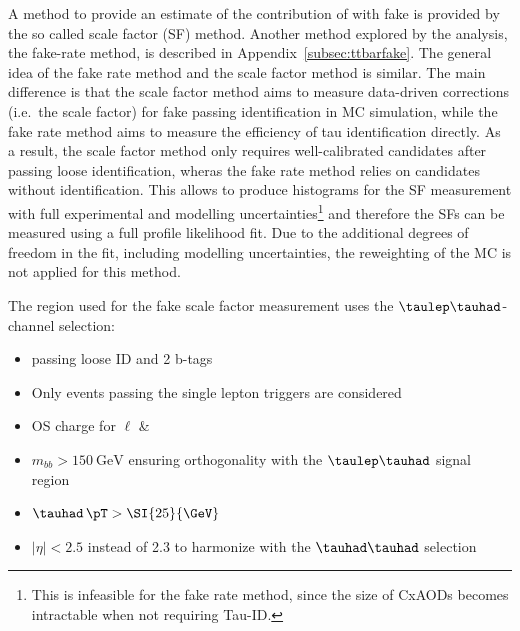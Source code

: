 A method to provide an estimate of the contribution of \ttbar with
fake \tauhad is provided by the so called scale factor (SF) method. Another method
explored by the analysis, the fake-rate method, is described in Appendix~\ref{subsec:ttbarfake}.
The general idea of the fake rate method and the scale factor method is similar. The main
difference is that the scale factor method aims to measure data-driven
corrections (i.e.\ the scale factor) for fake \tauhad passing identification in
\ttbar MC simulation, while the fake rate method aims to measure the efficiency
of tau identification directly. As a result, the scale factor method only
requires well-calibrated \tauhad candidates after passing loose identification,
wheras the fake rate method relies on \tauhad candidates without identification.
This allows to produce histograms for the SF measurement with full experimental
and modelling uncertainties\footnote{This is infeasible for the fake rate
  method, since the size of CxAODs becomes intractable when not requiring
  Tau-ID.} and therefore the SFs can be measured using a full profile likelihood
fit. Due to the additional degrees of freedom in the fit, including \ttbar
modelling uncertainties, the reweighting of the \ttbar MC is not applied for
this method.

The region used for the fake \tauhad scale factor measurement uses the
$\taulep\tauhad$-channel selection:
\begin{itemize}
\item \tauhad passing loose ID and 2 b-tags
\item Only events passing the single lepton triggers are considered
\item OS charge for $\ell$ \& \tauhad
\item $m_{bb} > \SI{150}{\GeV}$ ensuring orthogonality with the $\taulep\tauhad$
  signal region
\item $\tauhad \, \pT > \SI{25}{\GeV}$
\item \tauhad $\left|\eta\right| < 2.5$ instead of 2.3 to harmonize with the
  $\tauhad\tauhad$ selection
\end{itemize}

